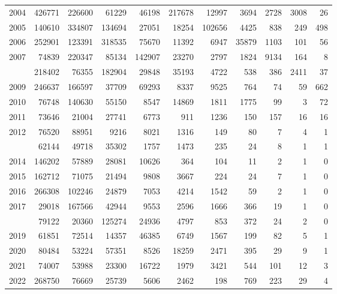 \documentclass[
]{article}
\begin{document}
\begin{longtable}[t]{lrrrrrrrrrr}
2004 & 426771 & 226600 & 61229 & 46198 & 217678 & 12997 & 3694 & 2728 & 3008 & 26\\
2005 & 140610 & 334807 & 134694 & 27051 & 18254 & 102656 & 4425 & 838 & 249 & 498\\
2006 & 252901 & 123391 & 318535 & 75670 & 11392 & 6947 & 35879 & 1103 & 101 & 56\\
2007 & 74839 & 220347 & 85134 & 142907 & 23270 & 2797 & 1824 & 9134 & 164 & 8\\
\addlinespace
2008 & 218402 & 76355 & 182904 & 29848 & 35193 & 4722 & 538 & 386 & 2411 & 37\\
2009 & 246637 & 166597 & 37709 & 69293 & 8337 & 9525 & 764 & 74 & 59 & 662\\
2010 & 76748 & 140630 & 55150 & 8547 & 14869 & 1811 & 1775 & 99 & 3 & 72\\
2011 & 73646 & 21004 & 27741 & 6773 & 911 & 1236 & 150 & 157 & 16 & 16\\
2012 & 76520 & 88951 & 9216 & 8021 & 1316 & 149 & 80 & 7 & 4 & 1\\
\addlinespace
2013 & 62144 & 49718 & 35302 & 1757 & 1473 & 235 & 24 & 8 & 1 & 1\\
2014 & 146202 & 57889 & 28081 & 10626 & 364 & 104 & 11 & 2 & 1 & 0\\
2015 & 162712 & 71075 & 21494 & 9808 & 3667 & 224 & 24 & 7 & 1 & 0\\
2016 & 266308 & 102246 & 24879 & 7053 & 4214 & 1542 & 59 & 2 & 1 & 0\\
2017 & 29018 & 167566 & 42944 & 9553 & 2596 & 1666 & 366 & 19 & 1 & 0\\
\addlinespace
2018 & 79122 & 20360 & 125274 & 24936 & 4797 & 853 & 372 & 24 & 2 & 0\\
2019 & 61851 & 72514 & 14357 & 46385 & 6749 & 1567 & 199 & 82 & 5 & 1\\
2020 & 80484 & 53224 & 57351 & 8526 & 18259 & 2471 & 395 & 29 & 9 & 1\\
2021 & 74007 & 53988 & 23300 & 16722 & 1979 & 3421 & 544 & 101 & 12 & 3\\
2022 & 268750 & 76669 & 25739 & 5606 & 2462 & 198 & 769 & 223 & 29 & 4\\*
\end{longtable}
\end{document}
